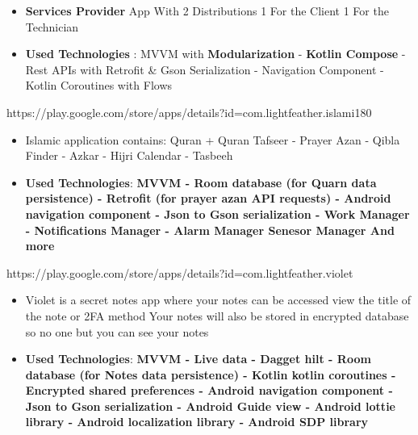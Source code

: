 \documentclass[10pt,a4paper,ragged2e,withhyper]{altacv}
\begin{document}
    \begin{paracol}{1}

        \begin{itemize}
            \item \textbf{Services Provider} App With 2 Distributions 1 For the Client 1 For the Technician
            \item \textbf{Used Technologies} : MVVM with \textbf{Modularization} - \textbf{Kotlin Compose} - Rest APIs with Retrofit \& Gson Serialization - Navigation Component - Kotlin Coroutines with Flows
        \end{itemize}
        \divider

        {\cvrepo{|\faGooglePlay\faAndroid}
        {https://play.google.com/store/apps/details?id=com.lightfeather.islami180}}{}{}
        \begin{itemize}
            \item \textbf{}Islamic application contains:
            Quran + Quran Tafseer - Prayer Azan - Qibla Finder - Azkar - Hijri Calendar - Tasbeeh
            \item \textbf{Used Technologies}: \textbf{MVVM -
            Room database (for Quarn data persistence) -
            Retrofit (for prayer azan API requests) -
            Android navigation component -
            Json to Gson serialization -
            Work Manager -
            Notifications Manager -
            Alarm Manager
            Senesor Manager And more
            }
        \end{itemize}
        \divider

        {\cvrepo{|\faGithub\faAndroid\faGooglePlay}
        {https://play.google.com/store/apps/details?id=com.lightfeather.violet}}{}{}
        \begin{itemize}
            \item Violet is a secret notes app where your notes can be accessed view the title of the note or 2FA method Your notes will also be stored in encrypted database so no one but you can see your notes
            \item \textbf{Used Technologies}: \textbf{MVVM -
            Live data -
            Dagget hilt -
            Room database (for Notes data persistence) -
            Kotlin kotlin coroutines -
            Encrypted shared preferences -
            Android navigation component -
            Json to Gson serialization -
            Android Guide view -
            Android lottie library -
            Android localization library -
            Android SDP library}
        \end{itemize}
        \divider


\end{paracol}
\end{document}
